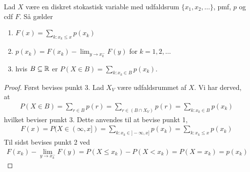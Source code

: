 \begin{prop}%
Lad $X$ være en diskret stokastisk variable med udfaldsrum $\{x_1, x_2, \ldots\}$, pmf, $p$ og cdf $F$. Så gælder
\begin{enumerate}
    \item $F(x)=\displaystyle \sum_{k:x_k \leq x} p(x_k)$
    \item $p(x_k)=F(x_k)- \displaystyle \lim_{y \rightarrow x_k^- } F(y)$ for $k= 1,2, \ldots $
    \item hvis $B \subseteq \mathbb{R}$ er $P(X \in B)= \displaystyle \sum_{k:x_k \in B} p(x_k)$.
\end{enumerate}
\end{prop} 
\begin{proof}
Først bevises punkt 3. Lad $X_V$ være udfaldsrummet af $X$. Vi har derved, at
\begin{align*}
    P(X\in B)=\sum_{r\in B}p(r)=\sum_{r\in(B\cap X_V)}p(r)=\sum_{k:x_k\in B}p(x_k)
\end{align*}
hvilket beviser punkt 3. Dette anvendes til at bevise punkt 1,
\begin{align*}
    F(x)=P(X\in(\infty,x])=\sum_{k:x_k\in ]-\infty,x]}p(x_k)=\sum_{k:x_k\leq x}p(x_k)
\end{align*}
Til sidst bevises punkt 2 ved
\begin{align*}
    F(x_k)-\lim_{y\rightarrow x_k^-}F(y)=P(X\leq x_k)-P(X<x_k)=P(X=x_k)=p(x_k)
\end{align*}
\end{proof}
